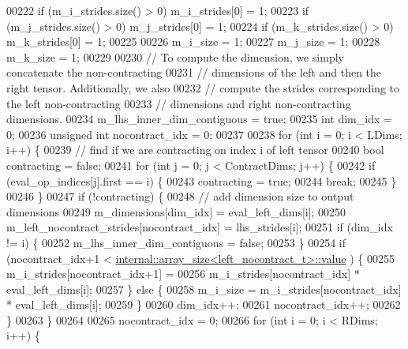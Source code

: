 \begin{DoxyCode}
00222     \textcolor{keywordflow}{if} (m\_i\_strides.size() > 0) m\_i\_strides[0] = 1;
00223     \textcolor{keywordflow}{if} (m\_j\_strides.size() > 0) m\_j\_strides[0] = 1;
00224     \textcolor{keywordflow}{if} (m\_k\_strides.size() > 0) m\_k\_strides[0] = 1;
00225 
00226     m\_i\_size = 1;
00227     m\_j\_size = 1;
00228     m\_k\_size = 1;
00229 
00230     \textcolor{comment}{// To compute the dimension, we simply concatenate the non-contracting}
00231     \textcolor{comment}{// dimensions of the left and then the right tensor. Additionally, we also}
00232     \textcolor{comment}{// compute the strides corresponding to the left non-contracting}
00233     \textcolor{comment}{// dimensions and right non-contracting dimensions.}
00234     m\_lhs\_inner\_dim\_contiguous = \textcolor{keyword}{true};
00235     \textcolor{keywordtype}{int} dim\_idx = 0;
00236     \textcolor{keywordtype}{unsigned} \textcolor{keywordtype}{int} nocontract\_idx = 0;
00237 
00238     \textcolor{keywordflow}{for} (\textcolor{keywordtype}{int} i = 0; i < LDims; i++) \{
00239       \textcolor{comment}{// find if we are contracting on index i of left tensor}
00240       \textcolor{keywordtype}{bool} contracting = \textcolor{keyword}{false};
00241       \textcolor{keywordflow}{for} (\textcolor{keywordtype}{int} j = 0; j < ContractDims; j++) \{
00242         \textcolor{keywordflow}{if} (eval\_op\_indices[j].first == i) \{
00243           contracting = \textcolor{keyword}{true};
00244           \textcolor{keywordflow}{break};
00245         \}
00246       \}
00247       \textcolor{keywordflow}{if} (!contracting) \{
00248         \textcolor{comment}{// add dimension size to output dimensions}
00249         m\_dimensions[dim\_idx] = eval\_left\_dims[i];
00250         m\_left\_nocontract\_strides[nocontract\_idx] = lhs\_strides[i];
00251         \textcolor{keywordflow}{if} (dim\_idx != i) \{
00252           m\_lhs\_inner\_dim\_contiguous = \textcolor{keyword}{false};
00253         \}
00254         \textcolor{keywordflow}{if} (nocontract\_idx+1 < \hyperlink{struct_eigen_1_1internal_1_1array__size}{internal::array\_size<left\_nocontract\_t>::value}
      ) \{
00255           m\_i\_strides[nocontract\_idx+1] =
00256               m\_i\_strides[nocontract\_idx] * eval\_left\_dims[i];
00257         \} \textcolor{keywordflow}{else} \{
00258           m\_i\_size = m\_i\_strides[nocontract\_idx] * eval\_left\_dims[i];
00259         \}
00260         dim\_idx++;
00261         nocontract\_idx++;
00262       \}
00263     \}
00264 
00265     nocontract\_idx = 0;
00266     \textcolor{keywordflow}{for} (\textcolor{keywordtype}{int} i = 0; i < RDims; i++) \{

\end{DoxyCode}
